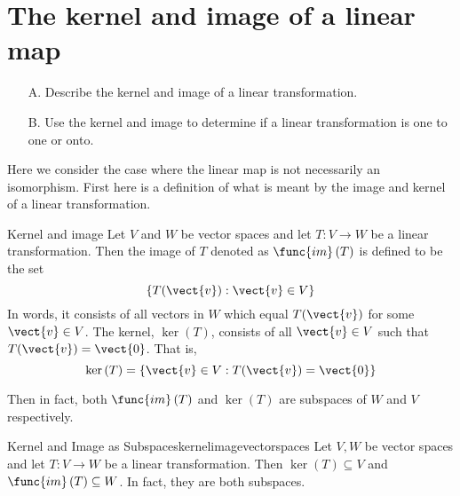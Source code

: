 \section{The kernel and image of a linear map}

\begin{outcome}
\begin{enumerate}
\item[A.] Describe the kernel and image of a linear transformation.

\item[B.] Use the kernel and image to determine if a linear transformation is one to one or onto. 
\end{enumerate}
\end{outcome}

Here we consider the case where the linear map is not necessarily an
isomorphism. First here is a definition of what is meant by the image and
kernel of a linear transformation.

\begin{definition}{Kernel and image}{}
Let $V$ and $W$ be vector spaces and let $T:V\rightarrow W$ be a linear transformation. Then the image of $T$
denoted as $\func{im}\left( T\right) $ is defined to be the set 
\begin{equation*}
\left\{ T(\vect{v}):\vect{v}\in V\right\}
\end{equation*}
In words, it consists of all vectors in $W$ which equal $T(\vect{v})$ for some $
\vect{v}\in V$. The kernel, $\ker \left( T\right) $, 
consists of all $\vect{v}\in V$ such that $T(\vect{v})=\vect{0}$. That is, 
\begin{equation*}
\ker \left( T\right) =\left\{ \vect{v}\in V:T(\vect{v})=\vect{0}\right\}
\end{equation*}
\end{definition}

Then in fact, both $\func{im}\left( T\right) $ and $\ker \left( T\right) $
are subspaces of $W$ and $V$ respectively.

\begin{proposition}{Kernel and Image as Subspaces}{kernelimagevectorspaces}
Let $V,W$ be vector spaces and let $T:V\rightarrow W$ be a linear transformation. Then $\ker \left(
T\right) \subseteq V$ and $\func{im}\left( T\right) \subseteq W$. In fact, they are both subspaces. 
\end{proposition}

